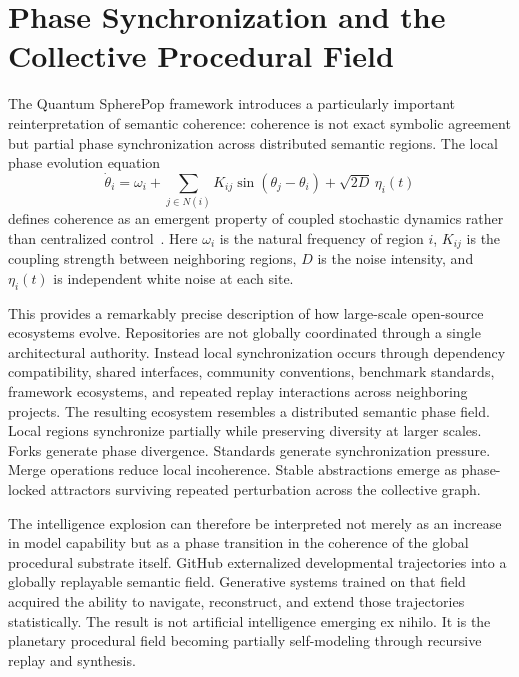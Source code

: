 \documentclass[12pt]{article}
\begin{document}
\section{Phase Synchronization and the Collective Procedural Field}

The Quantum SpherePop framework introduces a particularly important
reinterpretation of semantic coherence: coherence is not exact symbolic
agreement but partial phase synchronization across distributed semantic regions.
The local phase evolution equation
\[
\dot{\theta}_i
=
\omega_i
+
\sum_{j \in N(i)}
K_{ij}\sin(\theta_j - \theta_i)
+
\sqrt{2D}\,\eta_i(t)
\]
defines coherence as an emergent property of coupled stochastic dynamics rather
than centralized control~\cite{kuramoto1984}. Here $\omega_i$ is the natural frequency of region
$i$, $K_{ij}$ is the coupling strength between neighboring regions, $D$ is the
noise intensity, and $\eta_i(t)$ is independent white noise at each site.

This provides a remarkably precise description of how large-scale open-source
ecosystems evolve. Repositories are not globally coordinated through a single
architectural authority. Instead local synchronization occurs through dependency
compatibility, shared interfaces, community conventions, benchmark standards,
framework ecosystems, and repeated replay interactions across neighboring
projects. The resulting ecosystem resembles a distributed semantic phase field.
Local regions synchronize partially while preserving diversity at larger scales.
Forks generate phase divergence. Standards generate synchronization pressure.
Merge operations reduce local incoherence. Stable abstractions emerge as
phase-locked attractors surviving repeated perturbation across the collective
graph.

The intelligence explosion can therefore be interpreted not merely as an increase
in model capability but as a phase transition in the coherence of the global
procedural substrate itself. GitHub externalized developmental trajectories into
a globally replayable semantic field. Generative systems trained on that field
acquired the ability to navigate, reconstruct, and extend those trajectories
statistically. The result is not artificial intelligence emerging ex nihilo. It
is the planetary procedural field becoming partially self-modeling through
recursive replay and synthesis.
\end{document}
